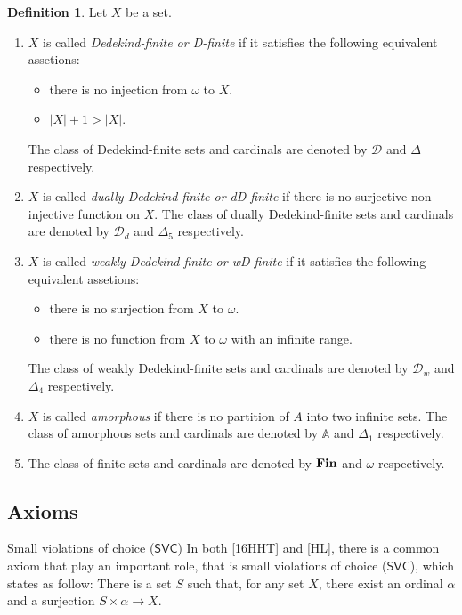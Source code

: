 \documentclass{amsart}
\newcommand{\SVC}{\ensuremath{\mathsf{SVC}}}
\newcommand{\Fin}{\textbf{\textup{Fin}}}
\newcommand{\1}{\ensuremath{\mathds{1}}}
\theoremstyle{plain}
\theoremstyle{boldrk}
\theoremstyle{definition}
\newtheorem{defn}[thm]{Definition}
\begin{document}
\begin{defn}
 Let $X$ be a set.
 \begin{enumerate}
     \item $X$ is called \emph{Dedekind-finite or D-finite} if it satisfies the following equivalent assetions:\begin{itemize}
         \item there is no injection from $\omega$ to $X$.
         \item $|X|+1>|X|$.
     \end{itemize} 
   The class of Dedekind-finite sets and cardinals are denoted by $\mathcal{D}$ and $\Delta$ respectively.
   
\item $X$ is called \emph{dually Dedekind-finite or dD-finite} if there is no surjective non-injective function on $X$.
   The class of dually Dedekind-finite sets and cardinals are denoted by $\mathcal{D}_{d}$ and $\Delta_{5}$ respectively.
   
     \item $X$ is called \emph{weakly Dedekind-finite or wD-finite} if it satisfies the following equivalent assetions:\begin{itemize}
         \item there is no surjection from $X$ to $\omega$.
         \item there is no function from $X$ to $\omega$ with an infinite range.
     \end{itemize} 
   The class of weakly Dedekind-finite sets and cardinals are denoted by $\mathcal{D}_{w}$ and $\Delta_{4}$ respectively.

   \item $X$ is called \emph{amorphous} if there is no partition of $A$ into two infinite sets. The class of amorphous sets and cardinals are denoted by $\mathbb{A}$ and $\Delta_{1}$ respectively.
   \item The class of finite sets and cardinals are denoted by $\Fin$ and $\omega$ respectively.
 \end{enumerate}
\end{defn}

\subsection{Axioms}

{Small violations of choice ($\SVC$)}
\noindent In both [16HHT] and [HL], there is a common axiom that play an important role, that is small violations of choice ($\SVC$), which states as follow: There is a set $S$ such that, for any set $X$, there exist an ordinal $\alpha$ and a
surjection $S\times\alpha\to X$. 
\end{document}
